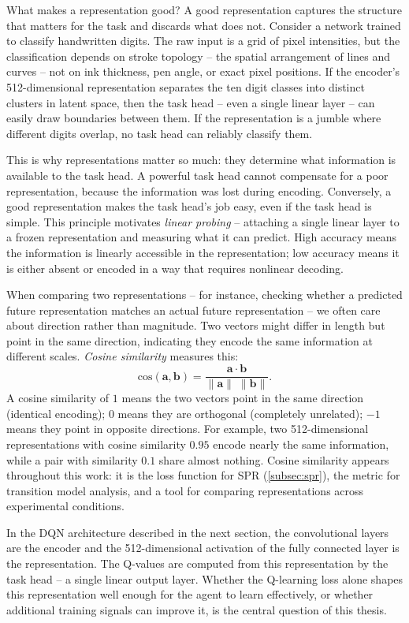 

\smallskip
What makes a representation good? A good representation captures
the structure that matters for the task and discards what does not.
Consider a network trained to classify handwritten digits. The raw
input is a grid of pixel intensities, but the classification
depends on stroke topology -- the spatial arrangement of lines and
curves -- not on ink thickness, pen angle, or exact pixel positions.
If the encoder's 512-dimensional representation separates the ten
digit classes into distinct clusters in latent space, then the task
head -- even a single linear layer -- can easily draw boundaries
between them. If the representation is a jumble where different
digits overlap, no task head can reliably classify them.

\smallskip
This is why representations matter so much: they determine what
information is available to the task head. A powerful task head
cannot compensate for a poor representation, because the
information was lost during encoding. Conversely, a good
representation makes the task head's job easy, even if the task
head is simple. This principle motivates \emph{linear probing} --
attaching a single linear layer to a frozen representation and
measuring what it can predict. High accuracy means the information
is linearly accessible in the representation; low accuracy means it
is either absent or encoded in a way that requires nonlinear
decoding.

\smallskip
When comparing two representations -- for instance, checking
whether a predicted future representation matches an actual future
representation -- we often care about direction rather than
magnitude. Two vectors might differ in length but point in the same
direction, indicating they encode the same information at different
scales. \emph{Cosine similarity} measures this:
%
\begin{equation}
\label{eq:cosine-similarity}
\text{cos}(\mathbf{a}, \mathbf{b})
  = \frac{\mathbf{a} \cdot \mathbf{b}}
         {\|\mathbf{a}\|\;\|\mathbf{b}\|}.
\end{equation}
%
A cosine similarity of $1$ means the two vectors point in the same
direction (identical encoding); $0$ means they are orthogonal
(completely unrelated); $-1$ means they point in opposite
directions. For example, two 512-dimensional representations with
cosine similarity $0.95$ encode nearly the same information, while
a pair with similarity $0.1$ share almost nothing. Cosine
similarity appears throughout this work: it is the loss function
for SPR (\cref{subsec:spr}), the metric for transition model
analysis, and a tool for comparing representations across
experimental conditions.

\smallskip
In the DQN architecture described in the next section, the
convolutional layers are the encoder and the 512-dimensional
activation of the fully connected layer is the representation.
The Q-values are computed from this representation by the task head
-- a single linear output layer. Whether the Q-learning loss alone
shapes this representation well enough for the agent to learn
effectively, or whether additional training signals can improve it,
is the central question of this thesis.
